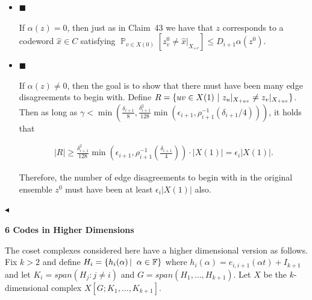 \begin{itemize}


\item[] 
$\blacksquare$ 


If $\alpha(z)=0$, then just as in Claim 43 we have that $z$ corresponds to a codeword $\hat{x}\in C$ satisfying $\operatorname*{\mathbb{P}}_{v\in X(0)}[z^{0}_{v}\not=\hat{x}|_{X_{+v}}]\leq D_{i+1}\alpha(z^{0})$.\par





\item[] 
$\blacksquare$ 


If $\alpha(z)\not=0$, then the goal is to show that there must have been many edge disagreements to begin with. Define $R=\{uv\in X(1)\nobreak\ |\nobreak\ z_{u}|_{X_{+uv}}\not=z_{v}|_{X_{+uv}}\}$. Then as long as $\gamma<\min\left(\frac{\delta_{i+1}}{8},\frac{\delta_{i+1}^{2}}{128}\min\left(\epsilon_{i+1},\rho_{i+1}^{-1}(\delta_{i+1}/4)\right)\right)$, it holds that\par


\[\begin{gathered}
|R|\geq\frac{\delta_{i+1}^{2}}{128}\min\left(\epsilon_{i+1},\rho_{i+1}^{-1}\left(\frac{\delta_{i+1}}{4}\right)\right)\cdot|X(1)|=\epsilon_{i}|X(1)|.
\end{gathered}\]


Therefore, the number of edge disagreements to begin with in the original ensemble $z^{0}$ must have been at least $\epsilon_{i}|X(1)|$ also.\par





\end{itemize}


$\blacktriangleleft$\par







\par\medskip\noindent\textbf{
6 Codes in Higher Dimensions}\par




The coset complexes considered here have a higher dimensional version as follows. Fix $k>2$ and define $H_{i}=\left\{h_{i}(\alpha)\left|\;\vphantom{h_{i}(\alpha)\alpha\in\mathbb{F}}\right.\alpha\in\mathbb{F}\right\}$ where $h_{i}(\alpha)=e_{i,i+1}(\alpha t)+I_{k+1}$
and let $K_{i}=span(H_{j}:j\neq i)$ and $G=span(H_{1},\ldots,H_{k+1})$.
Let $X$ be the $k$-dimensional complex $X[G;K_{1},\ldots,K_{k+1}]$.\par






